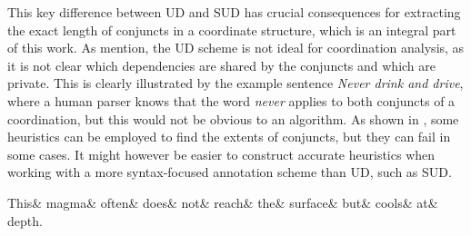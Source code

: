 \begin{exe}
    \ex
    \label{ex:distribution Mary}
    \begin{xlist}
    \end{xlist}
\end{exe}

This key difference between UD and SUD has crucial consequences for extracting the exact length of conjuncts in a coordinate structure, which is an integral part of this work. As \cite{prz:woz:23} mention, the UD scheme is not ideal for coordination analysis, as it is not clear which dependencies are shared by the conjuncts and which are private. This is clearly illustrated by the example sentence \textsl{Never drink and drive}, where a human parser knows that the word \textsl{never} applies to both conjuncts of a coordination, but this would not be obvious to an algorithm. As shown in \cite{pbg2023}, some heuristics can be employed to find the extents of conjuncts, but they can fail in some cases. It might however be easier to construct accurate heuristics when working with a more syntax-focused annotation scheme than UD, such as SUD. 


\begin{exe}
	\ex
	\label{ex:UD magma}
	\begin{dependency}
	\begin{deptext}
		 This\& magma\& often\& does\& not\& reach\& the\& surface\& but\& cools\& at\& depth.\\
	 \end{deptext} 
\end{dependency}
\end{exe}

